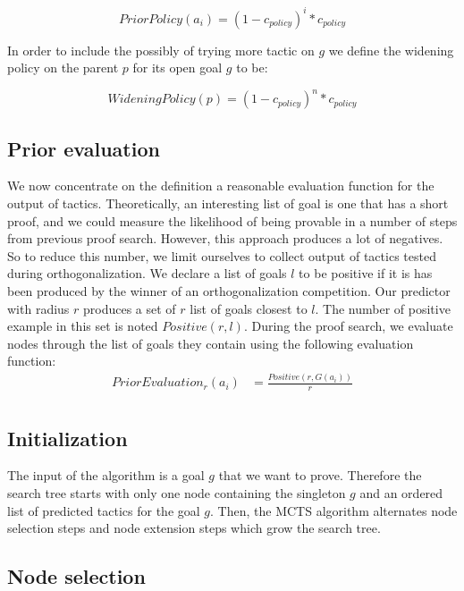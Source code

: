 \documentclass[runningheads,a4paper,draft]{svjour3}
\begin{document}
\[PriorPolicy(a_i) = (1 - c_{policy})^{i} * c_{policy}\]

In order to include the possibly of trying more tactic on $g$ we define the 
widening policy on the parent $p$ for its open goal $g$ to be:

\[WideningPolicy(p) = (1 - c_{policy})^{n} * c_{policy}\]


\subsection{Prior evaluation}\label{sec:evaluation}

We now concentrate on the definition a reasonable evaluation function for the 
output of tactics. Theoretically, an interesting list of goal is one 
that has a short proof, and we could measure the likelihood of being 
provable in a number of steps from previous proof search. However, this 
approach produces a lot of negatives. So to reduce this number, we limit 
ourselves to collect output of tactics tested during orthogonalization. We 
declare a list of goals $l$ to be positive if it is has been produced by the 
winner of an orthogonalization competition. Our predictor with radius $r$ 
produces a set of $r$ list of goals 
closest to $l$. The 
number of positive example in this set is noted $Positive(r,l)$.
During the proof search, we evaluate nodes through the list of goals they 
contain using the following evaluation function:
\begin{align*}
PriorEvaluation_r (a_i) &= \frac{Positive(r,G(a_i))}{r}\\
\end{align*}

\subsection{Initialization}
The input of the algorithm is a goal $g$ that we want to prove.
Therefore the search tree starts with only one node containing the singleton 
$g$ and an ordered list of predicted tactics for the goal $g$.
Then, the MCTS algorithm alternates node selection steps and node extension 
steps which grow the search tree.

\subsection{Node selection}

\end{document}
